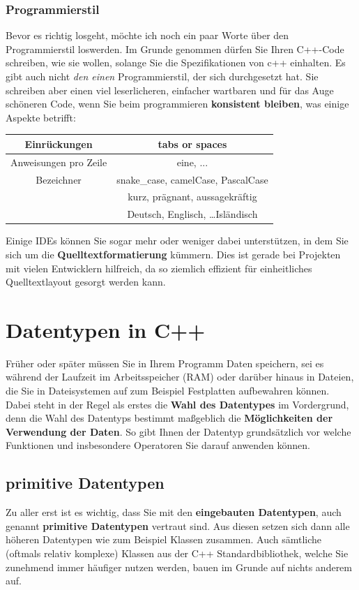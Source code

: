 \documentclass[a4paper]{report}
\begin{document}
\subsection{Programmierstil}
Bevor es richtig losgeht, möchte ich noch ein paar Worte über den Programmierstil loswerden. Im Grunde genommen dürfen Sie Ihren C++-Code schreiben, wie sie wollen, solange Sie die Spezifikationen von c++ einhalten. Es gibt auch nicht \textit{den einen} Programmierstil, der sich durchgesetzt hat. Sie schreiben aber einen viel leserlicheren, einfacher wartbaren und für das Auge schöneren Code, wenn Sie beim programmieren \textbf{konsistent bleiben}, was einige Aspekte betrifft:
\begin{center}
	\begin{tabular}{|c||c|}
		\hline
		Einrückungen	&	tabs or spaces \\ \hline
		Anweisungen pro Zeile & eine, ... \\ \hline
		Bezeichner		&	snake\_case, camelCase, PascalCase \\
		& kurz, prägnant, aussagekräftig \\ 
		& Deutsch, Englisch, \dots Isländisch \\ \hline
	\end{tabular}
\end{center}
Einige IDEs können Sie sogar mehr oder weniger dabei unterstützen, in dem Sie sich um die \textbf{Quelltextformatierung} kümmern. Dies ist gerade bei Projekten mit vielen Entwicklern hilfreich, da so ziemlich effizient für einheitliches Quelltextlayout gesorgt werden kann.

\chapter{Datentypen in C++} \label{real_start}

Früher oder später müssen Sie in Ihrem Programm Daten speichern, sei es während der Laufzeit im Arbeitsspeicher (RAM) oder darüber hinaus in Dateien, die Sie in Dateisystemen auf zum Beispiel Festplatten aufbewahren können. Dabei steht in der Regel als erstes die \textbf{Wahl des Datentypes} im Vordergrund, denn die Wahl des Datentyps bestimmt maßgeblich die \textbf{Möglichkeiten der Verwendung der Daten}. So gibt Ihnen der Datentyp grundsätzlich vor welche Funktionen und insbesondere Operatoren Sie darauf anwenden können.

\section{primitive Datentypen}
Zu aller erst ist es wichtig, dass Sie mit den \textbf{eingebauten Datentypen}, auch genannt \textbf{primitive Datentypen} vertraut sind. Aus diesen setzen sich dann alle höheren Datentypen wie zum Beispiel Klassen zusammen. Auch sämtliche (oftmals relativ komplexe) Klassen aus der C++ Standardbibliothek, welche Sie zunehmend immer häufiger nutzen werden, bauen im Grunde auf nichts anderem auf.
\end{document}
